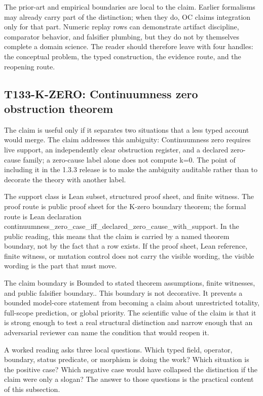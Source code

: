 The prior-art and empirical boundaries are local to the claim. Earlier formalisms may already carry part of the distinction; when they do, OC claims integration only for that part. Numeric replay rows can demonstrate artifact discipline, comparator behavior, and falsifier plumbing, but they do not by themselves complete a domain science. The reader should therefore leave with four handles: the conceptual problem, the typed construction, the evidence route, and the reopening route.

\subsection{T133-K-ZERO: Continuumness zero obstruction theorem}
The claim is useful only if it separates two situations that a less typed account would merge. The claim addresses this ambiguity: Continuumness zero requires live support, an independently clear obstruction register, and a declared zero-cause family; a zero-cause label alone does not compute k=0. The point of including it in the 1.3.3 release is to make the ambiguity auditable rather than to decorate the theory with another label.

The support class is Lean subset, structured proof sheet, and finite witness. The proof route is public proof sheet for the K-zero boundary theorem; the formal route is Lean declaration continuumness\_zero\_case\_iff\_declared\_zero\_cause\_with\_support. In the public reading, this means that the claim is carried by a named theorem boundary, not by the fact that a row exists. If the proof sheet, Lean reference, finite witness, or mutation control does not carry the visible wording, the visible wording is the part that must move.

The claim boundary is Bounded to stated theorem assumptions, finite witnesses, and public falsifier boundary.. This boundary is not decorative. It prevents a bounded model-core statement from becoming a claim about unrestricted totality, full-scope prediction, or global priority. The scientific value of the claim is that it is strong enough to test a real structural distinction and narrow enough that an adversarial reviewer can name the condition that would reopen it.

A worked reading asks three local questions. Which typed field, operator, boundary, status predicate, or morphism is doing the work? Which situation is the positive case? Which negative case would have collapsed the distinction if the claim were only a slogan? The answer to those questions is the practical content of this subsection.

